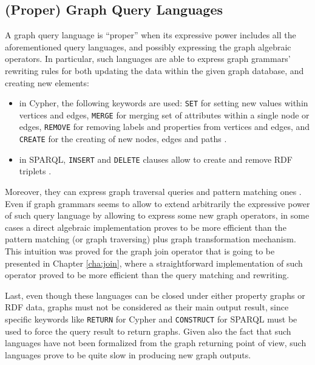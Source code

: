 
\subsection{(Proper) Graph Query Languages}\label{subsec:proper}
A graph query language is ``proper'' when its expressive power includes all the aforementioned query languages, and possibly expressing the graph algebraic operators. In particular, such languages are able to express graph grammars' rewriting rules for both updating the data within the given graph database, and creating new elements:
\begin{itemize}
	\item in Cypher, the following keywords are used: \texttt{SET} for setting new values within vertices and edges, \texttt{MERGE} for merging set of attributes within a single node or edges, \texttt{REMOVE} for removing labels and properties from vertices and edges, and \texttt{CREATE} for the creating of new nodes, edges and paths \cite{CypherCheat}.
	\item in SPARQL, \texttt{INSERT} and \texttt{DELETE} clauses allow to create and remove RDF triplets \cite{sparql11update2013}.
\end{itemize} 
Moreover, they can express graph traversal queries \cite{Kostylev2015} and pattern matching ones \cite{JunghannsKAPR17}. Even if graph grammars seems to allow to extend arbitrarily the expressive power of such query language by allowing to express some new graph operators, in some cases a direct algebraic implementation proves to be more efficient than the pattern matching (or graph traversing) plus graph transformation mechanism. This intuition was proved for the graph join operator that is going to be presented in Chapter \vref{cha:join}, where a straightforward implementation of such operator proved to be more efficient than the query matching and rewriting.


Last, even though these languages can be closed under either property graphs or RDF data, graphs must not be considered as their main output result, since specific keywords like  \texttt{RETURN} for Cypher and \texttt{CONSTRUCT} for SPARQL must be used to force the query result to return graphs. Given also the fact that such languages have not been formalized from the graph returning point of view, such languages prove to be quite slow in producing new graph outputs. 

